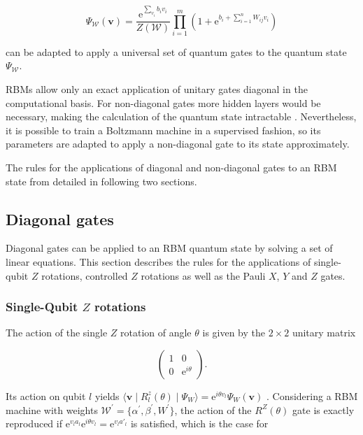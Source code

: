 \begin{equation}
   \Psi_{\mathcal{W}}(\bm{v}) = \frac{\mathrm{e}^{\sum_{v_i}b_iv_i}}{Z(\mathcal{W})}\prod_{i=1}^m(1+\mathrm{e}^{b_i + \sum_{i=1}^nW_{ij}v_i})
\end{equation}

can be adapted to apply a universal set of quantum gates to the quantum state $\Psi_{\mathcal{W}}$.

RBMs allow only an exact application of unitary gates diagonal in the computational basis. For non-diagonal 
gates more hidden layers would be necessary, making the calculation of the quantum state intractable \cite{carleo2018constructing}. Nevertheless, it is possible to train a Boltzmann machine in a supervised fashion, so its parameters are adapted to apply a non-diagonal gate to its state approximately.

The rules for the applications of diagonal and non-diagonal gates to an RBM state from 
\cite{jnsson2018neuralnetwork} detailed in following two sections.

\subsection{Diagonal gates}

Diagonal gates can be applied to an RBM quantum state by solving a set of linear equations. 
This section describes the rules for the applications of single-qubit $Z$ rotations, controlled $Z$ rotations 
as well as the Pauli $X$, $Y$ and $Z$ gates.

\subsubsection{Single-Qubit $Z$ rotations}
The action of the single $Z$ rotation of angle $\theta$ is given by the $2\times2$ unitary matrix

\begin{equation}
    \begin{pmatrix}
        1 & 0 \\
        0 & \mathrm{e}^{i\theta}
    \end{pmatrix} .
\end{equation}

Its action on qubit $l$ yields 
$\langle \bm{v} \mid R_{l}^{z}(\theta) \mid \Psi_{W}  \rangle = 
\mathrm{e}^{i\theta v_{l}} \Psi_{W}(\bm{v})
$
. Considering a RBM machine with weights $\mathcal{W}^{\prime} = \{\alpha^{\prime},\beta^{\prime},W^{\prime}\}$, the action of the $R^{Z}(\theta)$
gate is exactly reproduced if $\mathrm{e}^{v_{l}a_{l}}\mathrm{e}^{i\theta v_{l}} = \mathrm{e}^{v_{l}a\prime_{l}}$
is satisfied, which is the case for

